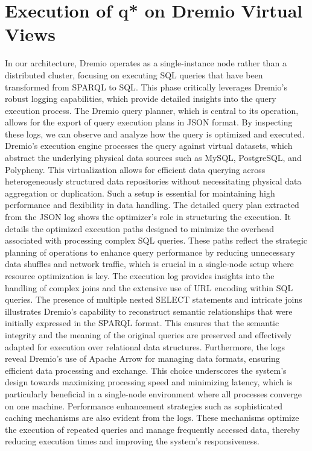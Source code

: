 \section{Execution of q* on Dremio Virtual Views}
In our architecture, Dremio operates as a single-instance node rather than a distributed cluster, focusing on executing \ac{SQL} queries that have been transformed from \ac{SPARQL} to \ac{SQL}. This phase critically leverages Dremio's robust logging capabilities, which provide detailed insights into the query execution process. The Dremio query planner, which is central to its operation, allows for the export of query execution plans in \ac{JSON} format. By inspecting these logs, we can observe and analyze how the query is optimized and executed.
Dremio's execution engine processes the query against virtual datasets, which abstract the underlying physical data sources such as MySQL, PostgreSQL, and Polypheny. This virtualization allows for efficient data querying across heterogeneously structured data repositories without necessitating physical data aggregation or duplication. Such a setup is essential for maintaining high performance and flexibility in data handling.
The detailed query plan extracted from the \ac{JSON} log shows the optimizer's role in structuring the execution. It details the optimized execution paths designed to minimize the overhead associated with processing complex \ac{SQL} queries. These paths reflect the strategic planning of operations to enhance query performance by reducing unnecessary data shuffles and network traffic, which is crucial in a single-node setup where resource optimization is key.
The execution log provides insights into the handling of complex joins and the extensive use of URL encoding within \ac{SQL} queries. The presence of multiple nested SELECT statements and intricate joins illustrates Dremio's capability to reconstruct semantic relationships that were initially expressed in the \ac{SPARQL} format. This ensures that the semantic integrity and the meaning of the original queries are preserved and effectively adapted for execution over relational data structures.
Furthermore, the logs reveal Dremio's use of Apache Arrow for managing data formats, ensuring efficient data processing and exchange. This choice underscores the system's design towards maximizing processing speed and minimizing latency, which is particularly beneficial in a single-node environment where all processes converge on one machine.
Performance enhancement strategies such as sophisticated caching mechanisms are also evident from the logs. These mechanisms optimize the execution of repeated queries and manage frequently accessed data, thereby reducing execution times and improving the system's responsiveness.
